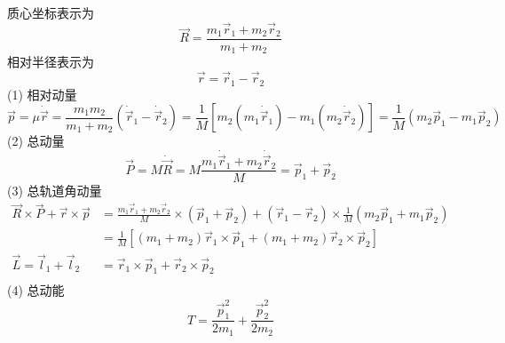 \begin{solution}
    质心坐标表示为
    $$
        \vec{R}=\frac{m_1\vec{r}_1+m_2\vec{r}_2}{m_1+m_2}
    $$
    相对半径表示为
    $$
        \vec{r}=\vec{r}_1-\vec{r}_2
    $$
    (1) 相对动量
    $$
        \vec{p}=\mu\dot{\vec{r}}
        =\frac{m_1m_2}{m_1+m_2}\left(\dot{\vec{r}}_1-\dot{\vec{r}}_2\right)
        =\frac{1}{M}[m_2(m_1\dot{\vec{r}}_1)-m_1(m_2\dot{\vec{r}}_2)]
        =\frac{1}{M}(m_2\vec{p}_1-m_1\vec{p}_2)
    $$
    (2) 总动量
    $$
        \vec{P}=M\dot{\vec{R}}
        =M\frac{m_1\dot{\vec{r}}_1+m_2\dot{\vec{r}}_2}{M}
        =\vec{p}_1+\vec{p}_2
    $$
    (3) 总轨道角动量
    $$
        \begin{aligned}
            \vec{R}\times\vec{P}+\vec{r}\times\vec{p} & =\frac{m_1\vec{r}_1+m_2\vec{r}_2}{M}\times\left(\vec{p}_1+\vec{p}_2\right)+\left(\vec{r}_1-\vec{r}_2\right)\times\frac{1}{M}\left(m_2\vec{p}_1+m_1\vec{p}_2\right) \\
                                                      & =\frac{1}{M}[(m_1+m_2)\vec{r}_1\times\vec{p}_1 + (m_1+m_2)\vec{r}_2\times\vec{p}_2]                                                                                \\
            \vec{L}=\vec{l}_1+\vec{l}_2               & =\vec{r}_1\times\vec{p}_1+\vec{r}_2\times\vec{p}_2                                                                                                                 \\
        \end{aligned}
    $$
    (4) 总动能
    $$
        T=\frac{\vec{p}_1^2}{2m_1}+\frac{\vec{p}_2^2}{2m_2}
    $$
\end{solution}


